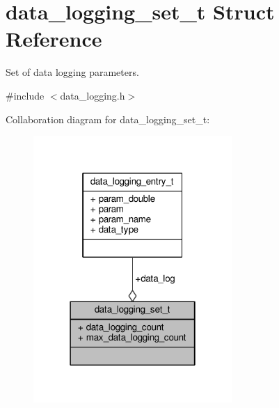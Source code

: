 \hypertarget{structdata__logging__set__t}{\section{data\+\_\+logging\+\_\+set\+\_\+t Struct Reference}
\label{structdata__logging__set__t}
}


Set of data logging parameters.  




{\ttfamily \#include $<$data\+\_\+logging.\+h$>$}



Collaboration diagram for data\+\_\+logging\+\_\+set\+\_\+t\+:
\nopagebreak
\begin{figure}[H]
\begin{center}
\leavevmode
\includegraphics[width=214pt]{structdata__logging__set__t__coll__graph}
\end{center}
\end{figure}
